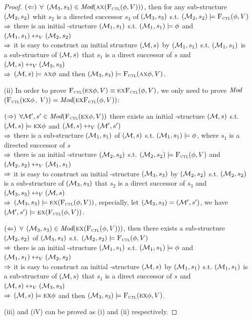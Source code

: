 \documentclass{article}
\begin{document}
\begin{proof}
$(\Leftarrow)$ $\forall$ $({\cal M}_3, s_3) \in \textit{Mod}(\textsc{a} \textsc{x} ({\textsc{F}_{\textsc{ctl}}}(\phi,V)))$, then for any sub-structure $({\cal M}_2, s_2)$ whit $s_2$ is a directed successor $s_3$ of $({\cal M}_3, s_3)$ s.t. $({\cal M}_2, s_2) \models {\textsc{F}_{\textsc{ctl}}}(\phi,V)$\\
$\Rightarrow$ there is an initial \MPK-structure $({\cal M}_1, s_1)$ s.t. $({\cal M}_1, s_1) \models \phi$ and $({\cal M}_1, s_1) \leftrightarrow_V ({\cal M}_2, s_2)$\\
$\Rightarrow$ it is easy to construct an initial structure $({\cal M},s)$ by $({\cal M}_1, s_1)$ s.t. $({\cal M}_1, s_1)$ is a sub-structure of $({\cal M}, s)$ that $s_1$ is a direct successor of $s$ and $({\cal M}, s)\leftrightarrow_V ({\cal M}_3, s_3)$\\
$\Rightarrow$ $({\cal M}, s) \models \textsc{a} \textsc{x} \phi$ and then $({\cal M}_3, s_3) \models {\textsc{F}_{\textsc{ctl}}}(\textsc{a} \textsc{x} \phi, V)$.


(ii) In order to prove ${\textsc{F}_{\textsc{ctl}}}(\textsc{e} \textsc{x} \phi, V) \equiv \textsc{e}\textsc{x}{\textsc{F}_{\textsc{ctl}}}(\phi, V)$, we only need to prove $\textit{Mod}$ $({\textsc{F}_{\textsc{ctl}}}(\textsc{e} \textsc{x} \phi$, $V)) = \textit{Mod}( \textsc{e}\textsc{x}{\textsc{F}_{\textsc{ctl}}}(\phi, V))$:

$(\Rightarrow)$ $\forall {\cal M}', s' \in \textit{Mod}({\textsc{F}_{\textsc{ctl}}}(\textsc{e} \textsc{x} \phi, V))$ there exists an initial \MPK-structure $({\cal M}, s)$ s.t. $({\cal M}, s) \models \textsc{e} \textsc{x} \phi$ and $({\cal M}, s) \leftrightarrow_V ({\cal M}',s')$\\
$\Rightarrow$ there is a sub-structure $({\cal M}_1, s_1)$ of $({\cal M}, s)$ s.t. $({\cal M}_1, s_1) \models \phi$, where $s_1$ is a directed successor of $s$\\
$\Rightarrow$ there is an initial \MPK-structure $({\cal M}_2, s_2)$ s.t. $({\cal M}_2, s_2) \models {\textsc{F}_{\textsc{ctl}}}(\phi,V)$ and $({\cal M}_2, s_2) \leftrightarrow_V ({\cal M}_1,s_1)$\\
$\Rightarrow$ it is easy to construct an initial \MPK-structure $({\cal M}_3, s_3)$ by $({\cal M}_2, s_2)$ s.t. $({\cal M}_2, s_2)$ is a sub-structure of $({\cal M}_3, s_3)$ that $s_2$ is a direct successor of $s_3$ and $({\cal M}_3, s_3) \leftrightarrow_V ({\cal M},s)$\\
$\Rightarrow$ $({\cal M}_3, s_3) \models \textsc{e} \textsc{x} ({\textsc{F}_{\textsc{ctl}}}(\phi,V))$, especially, let $({\cal M}_3, s_3) = ({\cal M}', s')$, we have $({\cal M}', s') \models \textsc{e} \textsc{x} ({\textsc{F}_{\textsc{ctl}}}(\phi,V))$.

$(\Leftarrow)$ $\forall$ $({\cal M}_3, s_3) \in \textit{Mod}(\textsc{e} \textsc{x} ({\textsc{F}_{\textsc{ctl}}}(\phi,V)))$, then there exists a sub-structure $({\cal M}_2, s_2)$ of $({\cal M}_3, s_3)$ s.t. $({\cal M}_2, s_2) \models {\textsc{F}_{\textsc{ctl}}}(\phi,V)$\\
$\Rightarrow$ there is an initial \MPK-structure $({\cal M}_1, s_1)$ s.t. $({\cal M}_1, s_1) \models \phi$ and $({\cal M}_1, s_1) \leftrightarrow_V ({\cal M}_2, s_2)$\\
$\Rightarrow$ it is easy to construct an initial \MPK-structure $({\cal M},s)$ by $({\cal M}_1, s_1)$ s.t. $({\cal M}_1, s_1)$ is a sub-structure of $({\cal M}, s)$ that $s_1$ is a direct successor of $s$ and $({\cal M}, s)\leftrightarrow_V ({\cal M}_3, s_3)$\\
$\Rightarrow$ $({\cal M}, s) \models \textsc{e} \textsc{x} \phi$ and then $({\cal M}_3, s_3) \models {\textsc{F}_{\textsc{ctl}}}(\textsc{e} \textsc{x} \phi, V)$.



(iii) and (iV) can be proved as (i) and (ii) respectively.
\end{proof}
\end{document}
